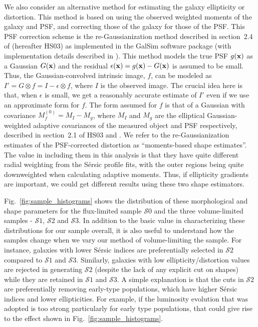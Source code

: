 \documentclass[twocolumn,useAMS,usenatbib]{mn2e}
\newcommand{\sersic}{S\'{e}rsic }
\newcommand{\s}{\ensuremath{\mathcal{S}}}
\begin{document}
We also consider an alternative method for estimating the galaxy
ellipticity or distortion.  This method is based on using the observed weighted
moments of the galaxy and PSF, and correcting those of the galaxy for
those of the PSF.  This PSF correction scheme is the
re-Gaussianization method described in section~2.4 of \cite{HS03}
(hereafter HS03) as implemented in the {\sc GalSim} software package
(with implementation details described in \citealt{2014arXiv1407.7676R}).
This method models the true PSF $g({\bf x})$ as a Gaussian $G({\bf x})$ and the residual $\epsilon({\bf x}) = g({\bf x}) - G({\bf x})$ is assumed to be small. Thus, the Gaussian-convolved
intrinsic image, $f$, can be modeled as $I' = G\otimes f = I - \epsilon \otimes f$, where $I$ is the observed image. The crucial idea here is that, when $\epsilon$ is small, we get a reasonably accurate
estimate of $I'$ even if we use an approximate form for $f$. The form
assumed for $f$ is that of a Gaussian with covariance $M_f^{(0)} = M_I
- M_g$, where $M_I$ and $M_g$ are the elliptical Gaussian-weighted adaptive
covariances of the measured object and PSF respectively, described in
section~2.1 of HS03 and \cite{BJ02}. We refer to the
re-Gaussianization estimates of the PSF-corrected distortion as
``moments-based shape estimates''.  The value in including them in
this analysis is that they have quite different radial weighting from
the \sersic profile fits, with the outer regions being quite
downweighted when calculating adaptive moments.  Thus, if ellipticity
gradients are important, we could get different results using these
two shape estimators.

Fig.~\ref{fig:sample_histograms} shows the distribution of these morphological and shape parameters for the flux-limited sample \s$0$ and the three
volume-limited samples - \s$1$, \s$2$ and \s$3$. In addition to the
basic value in characterizing these distributions for our sample
overall, it is also useful to understand how the samples change when
we vary our method of volume-limiting the sample.
For instance, galaxies with lower \sersic indices are preferentially
selected in \s$2$ compared to \s$1$ and \s$3$. Similarly, galaxies
with low ellipticity/distortion values 
are rejected in generating \s$2$ (despite the lack of any explicit
cut on shapes) while they are retained in
\s$1$ and \s$3$.  A simple explanation is that the cuts in \s$2$ are
preferentially removing early-type populations, which have higher
\sersic indices and lower ellipticities.  For example, if the
luminosity evolution that was adopted is too strong particularly for
early type populations, that could give rise to the effect shown in
Fig.~\ref{fig:sample_histograms}.
\end{document}
